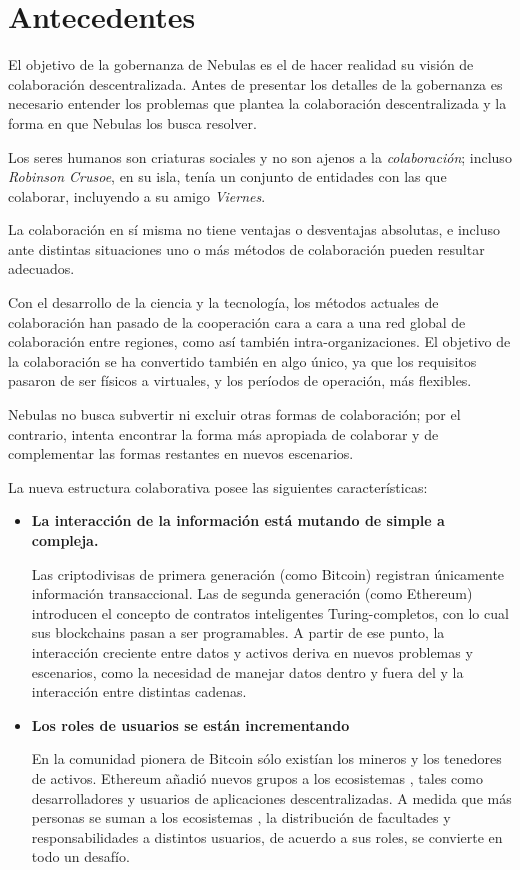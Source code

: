 \section{Antecedentes}

El objetivo de la gobernanza de Nebulas es el de hacer realidad su visión de colaboración descentralizada. Antes de presentar los detalles de la gobernanza es necesario entender los problemas que plantea la colaboración descentralizada y la forma en que Nebulas los busca resolver.

\label{background}

Los seres humanos son criaturas sociales y no son ajenos a la \textit{colaboración}; incluso \textit{Robinson Crusoe}, en su isla, tenía un conjunto de entidades con las que colaborar, incluyendo a su amigo \textit{Viernes}.~\cite{robinson}

La colaboración en sí misma no tiene ventajas o desventajas absolutas, e incluso ante distintas situaciones uno o más métodos de colaboración pueden resultar adecuados.

Con el desarrollo de la ciencia y la tecnología, los métodos actuales de colaboración han pasado de la cooperación cara a cara a una red global de colaboración entre regiones, como así también intra-organizaciones. El objetivo de la colaboración se ha convertido también en algo único, ya que los requisitos pasaron de ser físicos a virtuales, y los períodos de operación, más flexibles.

Nebulas no busca subvertir ni excluir otras formas de colaboración; por el contrario, intenta encontrar la forma más apropiada de colaborar y de complementar las formas restantes en nuevos escenarios.

La nueva estructura colaborativa posee las siguientes características:

\begin{itemize}
	\item \textbf{La interacción de la información está mutando de simple a compleja.}

	Las criptodivisas de primera generación (como Bitcoin) registran únicamente información transaccional. Las de segunda generación (como Ethereum) introducen el concepto de contratos inteligentes Turing-completos, con lo cual sus blockchains pasan a ser programables. A partir de ese punto, la interacción creciente entre datos y activos deriva en nuevos problemas y escenarios, como la necesidad de manejar datos dentro y fuera del \blockchain y la interacción entre distintas cadenas.

	\item \textbf{Los roles de usuarios se están incrementando}

	En la comunidad pionera de Bitcoin sólo existían los mineros y los tenedores de activos. Ethereum añadió nuevos grupos a los ecosistemas \blockchain, tales como desarrolladores y usuarios de aplicaciones descentralizadas. A medida que más personas se suman a los ecosistemas \blockchain, la distribución de facultades y responsabilidades a distintos usuarios, de acuerdo a sus roles, se convierte en todo un desafío.

\end{itemize}

